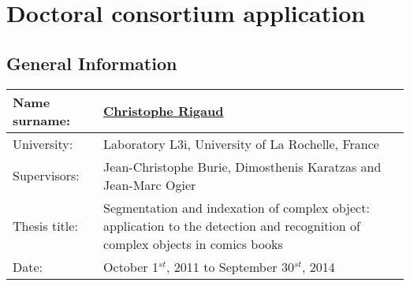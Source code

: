 \documentclass[final,12pt]{report} 						%
\begin{document}
	\renewcommand{\labelitemi}{$\bullet$}
	\renewcommand{\appendixtocname}{Annexes}
	\setcounter{tocdepth}{4}



\chapter{Doctoral consortium application}

\section{General Information}
  \begin{tabular}{| p{4cm} | p{12.8cm} | }
\hline
      Name surname: & \href{http://www.christophe-rigaud.com/}{Christophe Rigaud} \\
\hline
      University: & Laboratory L3i, University of La Rochelle, France\\
\hline
      Supervisors: & Jean-Christophe Burie, Dimosthenis Karatzas and Jean-Marc Ogier  \\ 
\hline
      Thesis title:&  Segmentation and indexation of complex object: application to the detection and recognition of complex objects in comics books\\
\hline
      Date:	&  October 1$^{st}$, 2011 to September 30$^{st}$, 2014 \\
\hline

    \end{tabular}
\end{document}
